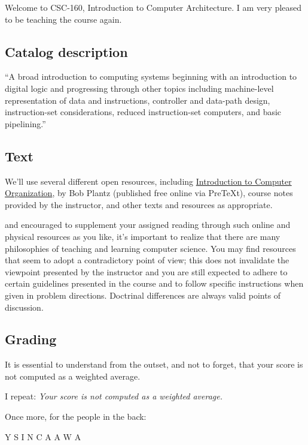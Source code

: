 \documentclass[symmetric]{tufte-handout}
\begin{document}
    Welcome to CSC-160, Introduction to Computer Architecture. I am very
    pleased to be teaching the course again.

\subsection{Catalog description}

    ``A broad introduction to computing systems beginning with an introduction
    to digital logic and progressing through other topics including
    machine-level representation of data and instructions, controller and
    data-path design, instruction-set considerations, reduced instruction-set
    computers, and basic pipelining.''

\subsection{Text}

    We'll use several different open resources, including
    \href{http://bob.cs.sonoma.edu/IntroCompOrg-RPi/intro-co-rpi.html}{Introduction
    to Computer Organization}, by Bob Plantz (published free online via
    PreTeXt), course notes provided by the instructor, and other texts and
    resources as appropriate.

     and encouraged to supplement your
    assigned reading through such online and physical resources as you like,
    it's important to realize that there are many philosophies of teaching and
    learning computer science. You may find resources that seem to adopt a
    contradictory point of view; this does not invalidate the viewpoint
    presented by the instructor and you are still expected to adhere to
    certain guidelines presented in the course and to follow specific
    instructions when given in problem directions. Doctrinal differences are
    always valid points of discussion.

\subsection{Grading}

    It is essential to understand from the outset, and not to forget, that
    your score is not computed as a weighted average.

    I repeat: \emph{Your score is not computed as a weighted average.}

    Once more, for the people in the back:
    \begin{framed}
        \begin{center}
            Y S I
            N C A
            A W A
        \end{center}
    \end{framed}
\end{document}
